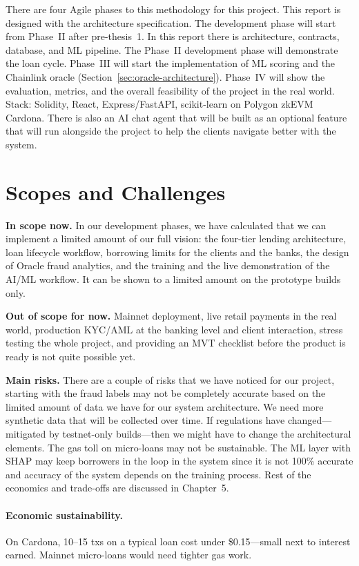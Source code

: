 \documentclass[12pt, a4paper]{report}
\begin{document}
There are four Agile phases to this methodology for this project. This report is designed with the architecture specification. The development phase will start from Phase~II after pre-thesis~1. In this report there is architecture, contracts, database, and ML pipeline. The Phase~II development phase will demonstrate the loan cycle. Phase~III will start the implementation of ML scoring and the Chainlink oracle (Section~\ref{sec:oracle-architecture}). Phase~IV will show the evaluation, metrics, and the overall feasibility of the project in the real world. Stack: Solidity, React, Express/FastAPI, scikit-learn on Polygon zkEVM Cardona. There is also an AI chat agent that will be built as an optional feature that will run alongside the project to help the clients navigate better with the system.

\section{Scopes and Challenges}
\label{sec:scopes-challenges}

\textbf{In scope now.} In our development phases, we have calculated that we can implement a limited amount of our full vision: the four-tier lending architecture, loan lifecycle workflow, borrowing limits for the clients and the banks, the design of Oracle fraud analytics, and the training and the live demonstration of the AI/ML workflow. It can be shown to a limited amount on the prototype builds only.

\textbf{Out of scope for now.} Mainnet deployment, live retail payments in the real world, production KYC/AML at the banking level and client interaction, stress testing the whole project, and providing an MVT checklist before the product is ready is not quite possible yet.

\textbf{Main risks.} There are a couple of risks that we have noticed for our project, starting with the fraud labels may not be completely accurate based on the limited amount of data we have for our system architecture. We need more synthetic data that will be collected over time. If regulations have changed---mitigated by testnet-only builds---then we might have to change the architectural elements. The gas toll on micro-loans may not be sustainable. The ML layer with SHAP may keep borrowers in the loop in the system since it is not 100\% accurate and accuracy of the system depends on the training process. Rest of the economics and trade-offs are discussed in Chapter~5.

\paragraph{Economic sustainability.} On Cardona, 10--15 txs on a typical loan cost under \$0.15---small next to interest earned. Mainnet micro-loans would need tighter gas work.
\end{document}
